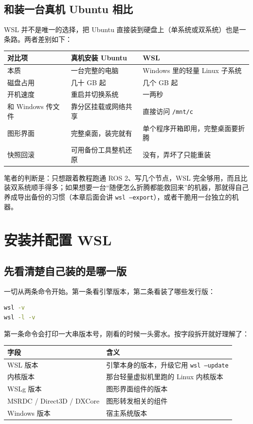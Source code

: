 \documentclass[12pt,a4paper]{ctexbook}
\begin{document}
\subsection{和装一台真机 Ubuntu 相比}

WSL 并不是唯一的选择，把 Ubuntu 直接装到硬盘上（单系统或双系统）也是一条路。两者差别如下：

\begin{center}
\small
\begin{tabular}{|l|l|l|}
\hline
\textbf{对比项} & \textbf{真机安装 Ubuntu} & \textbf{WSL} \\
\hline
本质 & 一台完整的电脑 & Windows 里的轻量 Linux 子系统 \\
磁盘占用 & 几十 GB 起 & 几个 GB 起 \\
开机速度 & 重启并切换系统 & 一两秒 \\
和 Windows 传文件 & 靠分区挂载或网络共享 & 直接访问 \texttt{/mnt/c} \\
图形界面 & 完整桌面，装完就有 & 单个程序开箱即用，完整桌面要折腾 \\
快照回滚 & 可用备份工具整机还原 & 没有，弄坏了只能重装 \\
\hline
\end{tabular}
\end{center}

笔者的判断是：只想跟着教程跑通 ROS 2、写几个节点，WSL 完全够用，而且比装双系统顺手得多；如果想要一台``随便怎么折腾都能救回来''的机器，那就得自己养成导出备份的习惯（本章后面会讲 \texttt{wsl --export}），或者干脆用一台独立的机器。

\section{安装并配置 WSL}

\subsection{先看清楚自己装的是哪一版}

一切从两条命令开始。第一条看引擎版本，第二条看装了哪些发行版：

\begin{lstlisting}[language=bash,title={查看 WSL 版本与已安装的发行版（在 PowerShell 中执行）}]
wsl -v
wsl -l -v
\end{lstlisting}

第一条命令会打印一大串版本号，刚看的时候一头雾水。按字段拆开就好理解了：

\begin{center}
\small
\begin{tabular}{|l|l|}
\hline
\textbf{字段} & \textbf{含义} \\
\hline
WSL 版本 & 引擎本身的版本，升级它用 \texttt{wsl --update} \\
内核版本 & 那台轻量虚拟机里跑的 Linux 内核版本 \\
WSLg 版本 & 图形界面组件的版本 \\
MSRDC / Direct3D / DXCore & 图形转发相关的组件 \\
Windows 版本 & 宿主系统版本 \\
\hline
\end{tabular}
\end{center}
\end{document}
